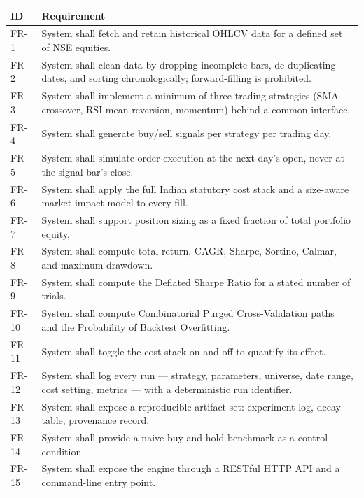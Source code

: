 \documentclass[12pt,a4paper,oneside]{report}
\begin{document}
\begin{center}
\begin{longtable}{@{}p{1.4cm}p{11.5cm}@{}}
\toprule
\textbf{ID} & \textbf{Requirement} \\
\midrule
\endfirsthead
FR-1 & System shall fetch and retain historical OHLCV data for a defined set of NSE equities. \\
FR-2 & System shall clean data by dropping incomplete bars, de-duplicating dates, and sorting chronologically; forward-filling is prohibited. \\
FR-3 & System shall implement a minimum of three trading strategies (SMA crossover, RSI mean-reversion, momentum) behind a common interface. \\
FR-4 & System shall generate buy/sell signals per strategy per trading day. \\
FR-5 & System shall simulate order execution at the next day's open, never at the signal bar's close. \\
FR-6 & System shall apply the full Indian statutory cost stack and a size-aware market-impact model to every fill. \\
FR-7 & System shall support position sizing as a fixed fraction of total portfolio equity. \\
FR-8 & System shall compute total return, CAGR, Sharpe, Sortino, Calmar, and maximum drawdown. \\
FR-9 & System shall compute the Deflated Sharpe Ratio for a stated number of trials. \\
FR-10 & System shall compute Combinatorial Purged Cross-Validation paths and the Probability of Backtest Overfitting. \\
FR-11 & System shall toggle the cost stack on and off to quantify its effect. \\
FR-12 & System shall log every run --- strategy, parameters, universe, date range, cost setting, metrics --- with a deterministic run identifier. \\
FR-13 & System shall expose a reproducible artifact set: experiment log, decay table, provenance record. \\
FR-14 & System shall provide a naive buy-and-hold benchmark as a control condition. \\
FR-15 & System shall expose the engine through a RESTful HTTP API and a command-line entry point. \\
\bottomrule
\end{longtable}
\end{center}
\end{document}
